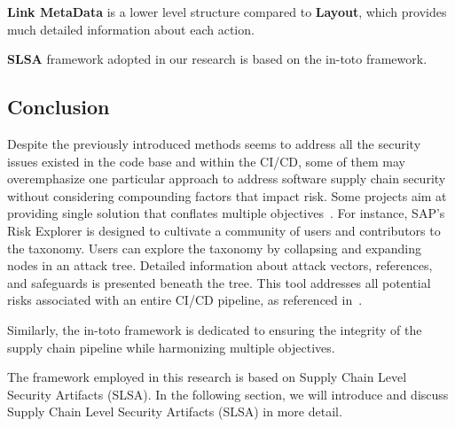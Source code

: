 \textbf{Link MetaData} is a lower level structure compared to \textbf{Layout}, which provides much detailed information about each action.

\textbf{SLSA} framework adopted in our research is based on the in-toto framework.

\subsection{Conclusion}
Despite the previously introduced methods seems to address all the security issues
existed in the code base and within the CI/CD, some of them may overemphasize one 
particular approach to address software supply chain security without considering 
compounding factors that impact risk.
Some projects aim at providing single solution that conﬂates multiple 
objectives~\cite{melara2022software}.
For instance, SAP's Risk Explorer is designed to cultivate a community of users 
and contributors to the taxonomy. Users can explore the taxonomy by collapsing and 
expanding nodes in an attack tree. Detailed information about attack vectors, 
references, and safeguards is presented beneath the tree. 
This tool addresses all potential risks associated with an entire CI/CD pipeline, 
as referenced in~\cite{ladisa2023journey}.

Similarly, the in-toto framework is dedicated to ensuring the integrity of the supply 
chain pipeline while harmonizing multiple objectives.

The framework employed in this research is based on Supply Chain Level Security 
Artifacts (SLSA). In the following section, we will introduce and discuss Supply Chain 
Level Security Artifacts (SLSA) in more detail.

    

